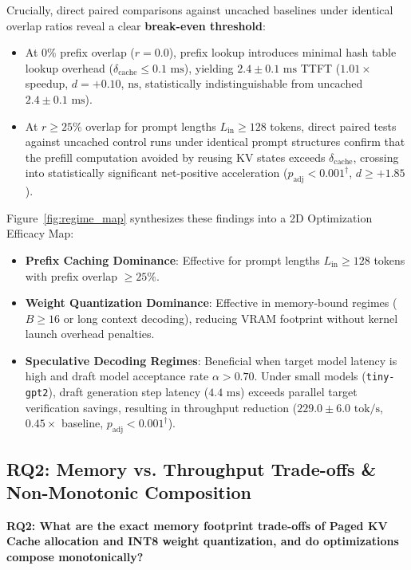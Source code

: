 Crucially, direct paired comparisons against uncached baselines under identical overlap ratios reveal a clear \textbf{break-even threshold}:
\begin{itemize}
    \item At $0\%$ prefix overlap ($r=0.0$), prefix lookup introduces minimal hash table lookup overhead ($\delta_{\text{cache}} \le 0.1\text{ ms}$), yielding $2.4 \pm 0.1\text{ ms}$ TTFT ($1.01\times$ speedup, $d = +0.10$, $\text{ns}$, statistically indistinguishable from uncached $2.4 \pm 0.1\text{ ms}$).
    \item At $r \ge 25\%$ overlap for prompt lengths $L_{\text{in}} \ge 128$ tokens, direct paired tests against uncached control runs under identical prompt structures confirm that the prefill computation avoided by reusing KV states exceeds $\delta_{\text{cache}}$, crossing into statistically significant net-positive acceleration ($p_{\text{adj}} < 0.001^\dagger$, $d \ge +1.85$).
\end{itemize}

Figure~\ref{fig:regime_map} synthesizes these findings into a 2D Optimization Efficacy Map:
\begin{itemize}
    \item \textbf{Prefix Caching Dominance}: Effective for prompt lengths $L_{\text{in}} \ge 128$ tokens with prefix overlap $\ge 25\%$.
    \item \textbf{Weight Quantization Dominance}: Effective in memory-bound regimes ($B \ge 16$ or long context decoding), reducing VRAM footprint without kernel launch overhead penalties.
    \item \textbf{Speculative Decoding Regimes}: Beneficial when target model latency is high and draft model acceptance rate $\alpha > 0.70$. Under small models (\texttt{tiny-gpt2}), draft generation step latency ($4.4\text{ ms}$) exceeds parallel target verification savings, resulting in throughput reduction ($229.0 \pm 6.0\text{ tok/s}$, $0.45\times$ baseline, $p_{\text{adj}} < 0.001^\dagger$).
\end{itemize}

\subsection{RQ2: Memory vs. Throughput Trade-offs \& Non-Monotonic Composition}
\label{sec:eval_rq2}

\textbf{RQ2: What are the exact memory footprint trade-offs of Paged KV Cache allocation and INT8 weight quantization, and do optimizations compose monotonically?}

